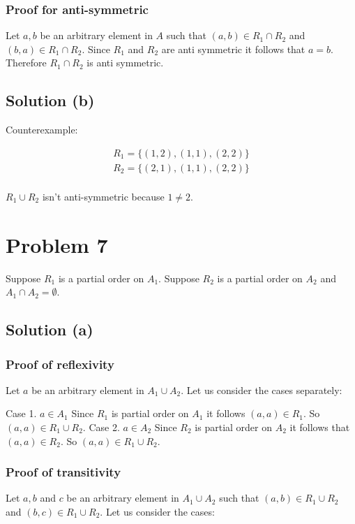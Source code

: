 \documentclass{article}
\begin{document}
\subsubsection{Proof for anti-symmetric}
Let $a,b$ be an arbitrary element in $A$ such that $(a,b) \in R_1 \cap
R_2$ and $(b,a) \in R_1 \cap R_2$. Since $R_1$ and $R_2$ are anti
symmetric it follows that $a = b$. Therefore $R_1 \cap R_2$ is anti
symmetric.

\subsection{Solution (b)}

Counterexample:

\begin{align*}
  R_1 = \{(1,2), (1,1), (2,2)\} \\
  R_2 = \{(2,1), (1,1), (2,2)\} \\
\end{align*}

$R_1 \cup R_2$ isn't anti-symmetric because $1 \neq 2$.

\section{Problem 7}
Suppose $R_1$ is a partial order on $A_1$. Suppose $R_2$ is a partial
order on $A_2$ and $A_1 \cap A_2 = \emptyset$.

\subsection{Solution (a)}

\subsubsection{Proof of reflexivity}
Let $a$ be an arbitrary element in $A_1 \cup A_2$. Let us consider the
cases separately:

Case 1. $a \in A_1$ Since $R_1$ is partial order on $A_1$ it follows
$(a,a) \in R_1$. So $(a,a) \in R_1 \cup R_2$.
Case 2. $a \in A_2$ Since $R_2$ is partial order on $A_2$ it follows
that $(a,a) \in R_2$. So $(a,a) \in R_1 \cup R_2$.

\subsubsection{Proof of transitivity}
Let $a,b$ and $c$ be an arbitrary element in $A_1 \cup A_2$ such that
$(a,b) \in R_1 \cup R_2$ and $(b,c) \in R_1 \cup R_2$. Let us consider
the cases:
\end{document}
